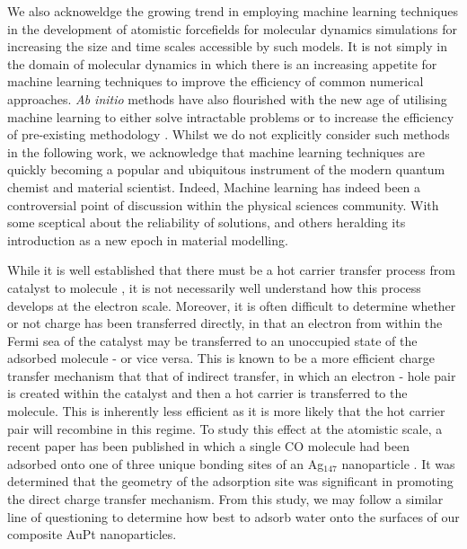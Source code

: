 We also acknoweldge the growing trend in employing machine learning techniques in the development of atomistic forcefields for molecular dynamics simulations \cite{MLInterface,hansen2019atomisticMLFF,ClaudioMFF,Flare} for increasing the size and time scales accessible by such models. It is not simply in the domain of molecular dynamics in which there is an increasing appetite for machine learning techniques to improve the efficiency of common numerical approaches. \textit{Ab initio} methods have also flourished with the new age of utilising machine learning to either solve intractable problems or to increase the efficiency of pre-existing methodology \cite{PhysRevResearch.4.023126,PhysRevX.10.041026,doi:10.1063/5.0024570,Nagai2020,doi:10.1126/science.abj6511,C8RA07112H,Schleder_2019}. Whilst we do not explicitly consider such methods in the following work, we acknowledge that machine learning techniques are quickly becoming a popular and ubiquitous instrument of the modern quantum chemist and material scientist. Indeed, Machine learning has indeed been a controversial point of discussion within the physical sciences community. With some sceptical about the reliability of solutions, and others heralding its introduction as a new epoch in material modelling.

While it is well established that there must be a hot carrier transfer process from catalyst to molecule \cite{doi:10.1021/acs.chemrev.7b00086,10.1039/9781839164668-00172}, it is not necessarily well understand how this process develops at the electron scale. Moreover, it is often difficult to determine whether or not charge has been transferred directly, in that an electron from within the Fermi sea of the catalyst may be transferred to an unoccupied state of the adsorbed molecule - or vice versa. This is known to be a more efficient charge transfer mechanism that that of indirect transfer, in which an electron - hole pair is created within the catalyst and then a hot carrier is transferred to the molecule. This is inherently less efficient as it is more likely that the hot carrier pair will recombine in this regime. To study this effect at the atomistic scale, a recent paper has been published in which a single CO molecule had been adsorbed onto one of three unique bonding sites of an Ag$_{147}$ nanoparticle \cite{AuTRansfer}. It was determined that the geometry of the adsorption site was significant in promoting the direct charge transfer mechanism. From this study, we may follow a similar line of questioning to determine how best to adsorb water onto the surfaces of our composite AuPt nanoparticles.

